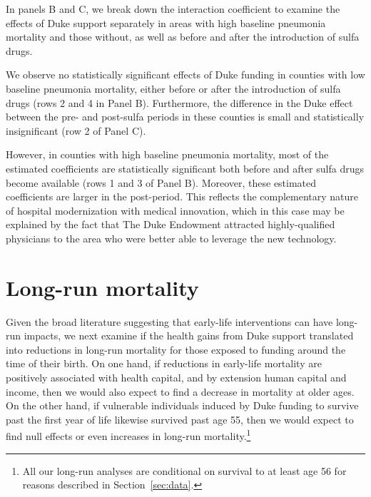 \documentclass[12pt]{article}
\begin{document}
In panels B and C, we break down the interaction coefficient to examine the effects of Duke support separately in areas with high baseline pneumonia mortality and those without, as well as before and after the introduction of sulfa drugs. 

We observe no statistically significant effects of Duke funding in counties with low baseline pneumonia mortality, either before or after the introduction of sulfa drugs (rows 2 and 4 in Panel B). Furthermore, the difference in the Duke effect between the pre- and post-sulfa periods in these counties is small and statistically insignificant (row 2 of Panel C). 

However, in counties with high baseline pneumonia mortality, most of the estimated coefficients are statistically significant both before and after sulfa drugs become available (rows 1 and 3 of Panel B). Moreover, these estimated coefficients are larger in the post-period. 
This reflects the complementary nature of hospital modernization with medical innovation, which in this case may be explained by the fact that The Duke Endowment attracted highly-qualified physicians to the area who were better able to leverage the new technology. 


\section{Long-run mortality} \label{sec:lrm}

Given the broad literature suggesting that early-life interventions can have long-run impacts, we next examine if the health gains from Duke support translated into reductions in long-run mortality for those exposed to funding around the time of their birth. 
On one hand, if reductions in early-life mortality are positively associated with health capital, and by extension human capital and income, then we would also expect to find a decrease in mortality at older ages.
On the other hand, if vulnerable individuals induced by Duke funding to survive past the first year of life likewise survived past age 55, then we would expect to find null effects or even increases in long-run mortality.\footnote{All our long-run analyses are conditional on survival to at least age 56 for reasons described in Section~\ref{sec:data}.}
\end{document}
